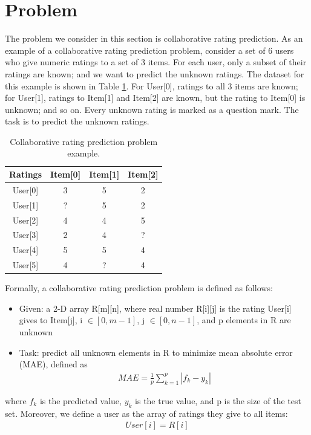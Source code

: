 \documentclass[12pt]{WSUThesis}
\theoremstyle{definition}
\begin{document}
\section{Problem}
The problem we consider in this section is collaborative rating prediction.
As an example of a collaborative rating prediction problem, consider 
a set of 6 users who give numeric ratings to a set of 3 items.
For each user, only a subset of their ratings are known; 
and we want to predict the unknown ratings.
The dataset for this example is shown in Table \ref{tab:ratings}.
For User[0], ratings to all 3 items are known; 
for User[1], ratings to Item[1] and Item[2] are known, 
but the rating to Item[0] is unknown; and so on.
Every unknown rating is marked as a question mark.
The task is to predict the unknown ratings.
\begin{table}[!htb]
	\centering
	\caption{Collaborative rating prediction problem example.}
	\begin{tabular}{cccc} \hline
		Ratings & Item[0] & Item[1] & Item[2] \\ \hline
		User[0] & 3       & 5       & 2 \\ \hline
		User[1] & ?       & 5       & 2 \\ \hline
		User[2] & 4       & 4       & 5 \\ \hline
		User[3] & 2       & 4       & ? \\ \hline
		User[4] & 5       & 5       & 4 \\ \hline
		User[5] & 4       & ?       & 4 \\ \hline
	\end{tabular}
	\label{tab:ratings}
\end{table}
Formally, a collaborative rating prediction problem is defined as follows:
\begin{itemize}
	\item Given: a 2-D array R[m][n], 
	where real number R[i][j] is the rating User[i] gives to Item[j], i $ \in [0, m-1] $, j $ \in [0, n-1] $,
	and p elements in R are unknown
	\item Task: predict all unknown elements in R to minimize mean absolute error (MAE), defined as
	\begin{align*}
	MAE = \frac{1}{p} \sum_{k = 1}^{p}|f_k - y_k|
	\end{align*}
\end{itemize}
where $ f_k $ is the predicted value, $ y_k $ is the true value, and p is the 
size of the test set.
Moreover, we define a user as the array of ratings they give to all items: 
\begin{align*}
User[i] = R[i]
\end{align*}
\end{document}
